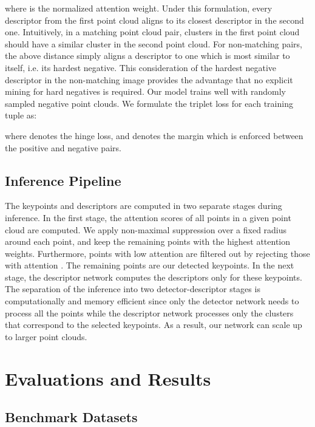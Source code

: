 \documentclass[runningheads]{llncs}
\begin{document}
\noindent where  is the normalized attention weight.
Under this formulation, every descriptor from the first point cloud aligns to its closest descriptor in the second one. Intuitively, in a matching point cloud pair, clusters in the first point cloud should have a similar cluster in the second point cloud. For non-matching pairs, the above distance simply aligns a descriptor to one which is most similar to itself, i.e. its hardest negative. This consideration of the hardest negative descriptor in the non-matching image provides the advantage that no explicit mining for hard negatives is required. Our model trains well with randomly sampled negative point clouds.
We formulate the triplet loss for each training tuple 
as:

\noindent where  denotes the hinge loss, and  denotes the margin which is enforced between the positive and negative pairs.

\subsection{Inference Pipeline}
The keypoints and descriptors are computed in two separate stages during inference. In the first stage, the attention scores of all points in a given point cloud are computed. We apply non-maximal suppression over a fixed radius  around each point, and keep the remaining  points with the highest attention weights. Furthermore, points with low attention are filtered out by rejecting those with attention . The remaining points are our detected keypoints. In the next stage, the descriptor network computes the descriptors only for these keypoints. 
The separation of the inference into two detector-descriptor stages is computationally and memory efficient since only the detector network needs to process all the points while the descriptor network processes only the clusters that correspond to the selected keypoints. As a result, our network can scale up to larger point clouds.


\section{Evaluations and Results}
\subsection{Benchmark Datasets}
\end{document}
